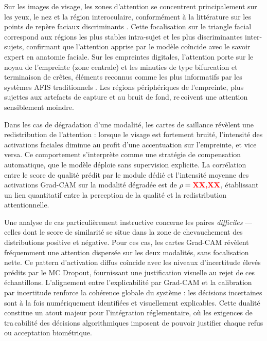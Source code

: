 \documentclass[12pt,a4paper]{report}
\begin{document}
Sur les images de visage, les zones d'attention se concentrent principalement sur les yeux, le nez et la r\'{e}gion interoculaire, conform\'{e}ment \`{a} la litt\'{e}rature sur les points de rep\`{e}re faciaux discriminants \cite{zhao2003discriminant}. Cette focalisation sur le triangle facial correspond aux r\'{e}gions les plus stables intra-sujet et les plus discriminantes inter-sujets, confirmant que l'attention apprise par le mod\`{e}le co\^{i}ncide avec le savoir expert en anatomie faciale. Sur les empreintes digitales, l'attention porte sur le noyau de l'empreinte (zone centrale) et les minuties de type bifurcation et terminaison de cr\^{e}tes, \'{e}l\'{e}ments reconnus comme les plus informatifs par les syst\`{e}mes AFIS traditionnels \cite{maltoni2009handbook}. Les r\'{e}gions p\'{e}riph\'{e}riques de l'empreinte, plus sujettes aux artefacts de capture et au bruit de fond, re\,{c}oivent une attention sensiblement moindre.

Dans les cas de d\'{e}gradation d'une modalit\'{e}, les cartes de saillance r\'{e}v\`{e}lent une redistribution de l'attention : lorsque le visage est fortement bruit\'{e}, l'intensit\'{e} des activations faciales diminue au profit d'une accentuation sur l'empreinte, et vice versa. Ce comportement s'interpr\`{e}te comme une strat\'{e}gie de compensation automatique, que le mod\`{e}le d\'{e}ploie sans supervision explicite. La corr\'{e}lation entre le score de qualit\'{e} pr\'{e}dit par le module d\'{e}di\'{e} et l'intensit\'{e} moyenne des activations Grad-CAM sur la modalit\'{e} d\'{e}grad\'{e}e est de $\rho = \textcolor{red}{\textbf{XX,XX}}$, \'{e}tablissant un lien quantitatif entre la perception de la qualit\'{e} et la redistribution attentionnelle.

Une analyse de cas particuli\`{e}rement instructive concerne les paires \textit{difficiles} --- celles dont le score de similarit\'{e} se situe dans la zone de chevauchement des distributions positive et n\'{e}gative. Pour ces cas, les cartes Grad-CAM r\'{e}v\`{e}lent fr\'{e}quemment une attention dispers\'{e}e sur les deux modalit\'{e}s, sans focalisation nette. Ce pattern d'activation diffus co\^{i}ncide avec les niveaux d'incertitude \'{e}lev\'{e}s pr\'{e}dits par le MC Dropout, fournissant une justification visuelle au rejet de ces \'{e}chantillons. L'alignement entre l'explicabilit\'{e} par Grad-CAM et la calibration par incertitude renforce la coh\'{e}rence globale du syst\`{e}me : les d\'{e}cisions incertaines sont \`{a} la fois num\'{e}riquement identifi\'{e}es et visuellement explicables. Cette dualit\'{e} constitue un atout majeur pour l'int\'{e}gration r\'{e}glementaire, o\`{u} les exigences de tra\,{c}abilit\'{e} des d\'{e}cisions algorithmiques imposent de pouvoir justifier chaque refus ou acceptation biom\'{e}trique.
\end{document}
